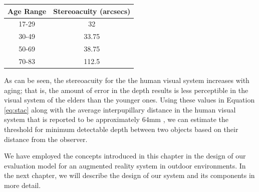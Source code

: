 \begin{minipage}{\linewidth}
\begin{center}
\label{tab:stAcAge}
\begin{tabular}{ |c|c| }
\hline
\textbf{Age Range} & \textbf{Stereoacuity (arcsecs)} \\ \hline
17-29 & 32 \\  \hline
30-49 & 33.75 \\ \hline
50-69 & 38.75 \\ \hline
70-83 & 112.5 \\ \hline
\end{tabular}
\end{center}
\end{minipage} \newline \newline

As can be seen, the stereoacuity for the the human visual system increases with aging; that is, 
the amount of error in the depth results 
is less perceptible in the visual system of the elders than the younger ones.
Using these values in Equation \ref{eq:stac} along with the average interpupillary distance in the human visual system 
that is reported to be approximately $64$mm \cite{how95}, 
we can estimate the threshold for minimum detectable depth
between two objects based on their distance from the observer. \newline 

We have employed the concepts introduced in this chapter in the design of our evaluation model for an augmented reality system 
in outdoor environments.
In the next chapter, we will describe the design of our system and its components in more detail.
